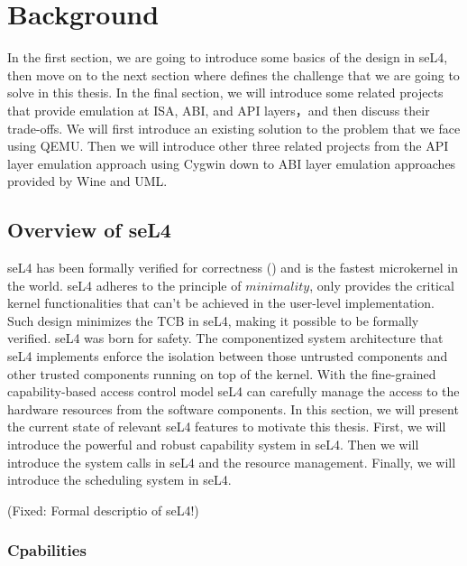 \chapter{Background}\label{ch:background}

In the first section, we are going to introduce some basics of the design in seL4, then move on to the next section where defines the challenge that we are going to solve in this thesis. In the final section, we will introduce some related projects that provide emulation at ISA, ABI, and API layers，and then discuss their trade-offs. We will first introduce an existing solution to the problem that we face using QEMU. Then we will introduce other three related projects from the API layer emulation approach using Cygwin down to ABI layer emulation approaches provided by Wine and UML.      

\section{Overview of seL4}

seL4 has been formally verified for correctness (\cite{Klein_EHACDEEKNSTW_09}) and is the fastest microkernel in the world. seL4 adheres to the principle of $minimality$, only provides the critical kernel functionalities that can't be achieved in the user-level implementation. Such design minimizes the TCB in seL4, making it possible to be formally verified. seL4 was born for safety. The componentized system architecture that seL4 implements enforce the isolation between those untrusted components and other trusted components running on top of the kernel. With the fine-grained capability-based access control model seL4 can carefully manage the access to the hardware resources from the software components. In this section, we will present the current state of relevant seL4 features to motivate this thesis. First, we will introduce the powerful and robust capability system in seL4. Then we will introduce the system calls in seL4 and the resource management. Finally, we will introduce the scheduling system in seL4.

(Fixed: Formal descriptio of seL4!)

\subsection{Cpabilities}


